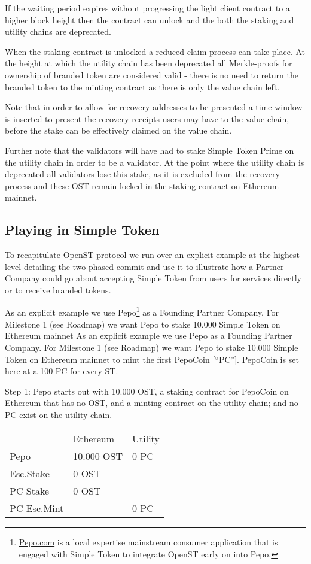 \documentclass[12pt,a4paper, twocolumn]{article}
\begin{document}
If the waiting period expires without progressing the light client contract to a higher block height then the contract can unlock and the both the staking and utility chains are deprecated.\par
When the staking contract is unlocked a reduced claim process can take place.  At the height at which the utility chain has been deprecated all Merkle-proofs for ownership of branded token are considered valid - there is no need to return the branded token to the minting contract as there is only the value chain left. \par
Note that in order to allow for recovery-addresses to be presented a time-window is inserted to present the recovery-receipts users may have to the value chain, before the stake can be effectively claimed on the value chain. \par
Further note that the validators will have had to stake Simple Token Prime on the utility chain in order to be a validator.  At the point where the utility chain is deprecated all validators lose this stake, as it is excluded from the recovery process and these OST remain locked in the staking contract on Ethereum mainnet. \par

\subsection{Playing in Simple Token}
To recapitulate OpenST protocol we run over an explicit example at the highest level detailing the two-phased commit and use it to illustrate how a Partner Company could go about accepting Simple Token from users for services directly or to receive branded tokens.\par
As an explicit example we use Pepo\footnote{ \href{https://pepo.com/}{Pepo.com} is a local expertise mainstream consumer application that is engaged with Simple Token to integrate OpenST early on into Pepo.} as a Founding Partner Company.  For Milestone 1 (see Roadmap) we want Pepo to stake 10.000 Simple Token on Ethereum mainnet As an explicit example we use Pepo as a Founding Partner Company.  For Milestone 1 (see Roadmap) we want Pepo to stake 10.000 Simple Token on Ethereum mainnet to mint the first PepoCoin [“PC”].  PepoCoin is set here at a 100 PC for every ST.\par
Step 1: Pepo starts out with 10.000 OST, a staking contract for PepoCoin on Ethereum that has no OST, and a minting contract on the utility chain; and no PC exist on the utility chain.\par
\begin{table}[H]
\centering
\label{Step-1}
\begin{tabular}{lll}
    & Ethereum    &   Utility   \\
Pepo        & 10.000 OST & 0 PC \\
Esc.Stake   & 0 OST      &      \\
PC Stake    & 0 OST      &      \\
PC Esc.Mint &            & 0 PC
\end{tabular}
\end{table}
\end{document}
